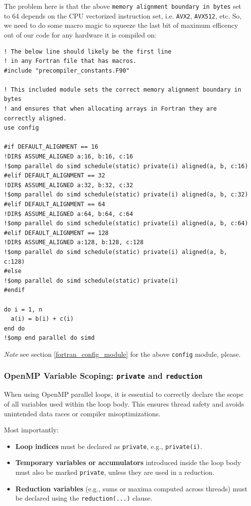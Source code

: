 \documentclass{article}
\begin{document}
The problem here is that the above \texttt{memory alignment boundary in bytes}
set to 64 depends on the CPU vectorized instruction set, i.e. \texttt{AVX2},
\texttt{AVX512}, etc. So, we need to do some macro magic to squeeze the last
bit of maximum efficency out of our code for any hardware it is compiled on:

\begin{verbatim}
! The below line should likely be the first line
! in any Fortran file that has macros.
#include "precompiler_constants.F90"

! This included module sets the correct memory alignment boundary in bytes
! and ensures that when allocating arrays in Fortran they are correctly aligned.
use config

#if DEFAULT_ALIGNMENT == 16
!DIR$ ASSUME_ALIGNED a:16, b:16, c:16
!$omp parallel do simd schedule(static) private(i) aligned(a, b, c:16)
#elif DEFAULT_ALIGNMENT == 32
!DIR$ ASSUME_ALIGNED a:32, b:32, c:32
!$omp parallel do simd schedule(static) private(i) aligned(a, b, c:32)
#elif DEFAULT_ALIGNMENT == 64
!DIR$ ASSUME_ALIGNED a:64, b:64, c:64
!$omp parallel do simd schedule(static) private(i) aligned(a, b, c:64)
#elif DEFAULT_ALIGNMENT == 128
!DIR$ ASSUME_ALIGNED a:128, b:128, c:128
!$omp parallel do simd schedule(static) private(i) aligned(a, b, c:128)
#else
!$omp parallel do simd schedule(static) private(i)
#endif

do i = 1, n
  a(i) = b(i) + c(i)
end do
!$omp end parallel do simd
\end{verbatim}

\emph{Note} see section \ref{fortran_config_module} for the above
\texttt{config} module, please.

\subsubsection{OpenMP Variable Scoping: \texttt{private} and \texttt{reduction}}

When using OpenMP parallel loops, it is essential to correctly declare the scope of all variables used within the loop body. This ensures thread safety and avoids unintended data races or compiler misoptimizations.

Most importantly:

\begin{itemize}
  \item \textbf{Loop indices} must be declared as \texttt{private}, e.g., \texttt{private(i)}.
  \item \textbf{Temporary variables or accumulators} introduced inside the loop body must also be marked \texttt{private}, unless they are used in a reduction.
  \item \textbf{Reduction variables} (e.g., sums or maxima computed across threads) must be declared using the \texttt{reduction(...)} clause.
\end{itemize}
\end{document}

